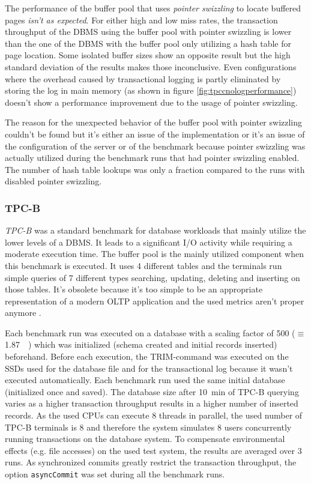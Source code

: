     The performance of the buffer pool that uses \emph{pointer swizzling} to locate buffered pages \emph{isn't as expected}. For either high and low miss rates, the transaction throughput of the DBMS using the buffer pool with pointer swizzling is lower than the one of the DBMS with the buffer pool only utilizing a hash table for page location. Some isolated buffer sizes show an opposite result but the high standard deviation of the results makes those inconclusive. Even configurations where the overhead caused by transactional logging is partly eliminated by storing the log in main memory (as shown in figure \ref{fig:tpccnologperformance}) doesn't show a performance improvement due to the usage of pointer swizzling.

    The reason for the unexpected behavior of the buffer pool with pointer swizzling couldn't be found but it's either an issue of the implementation or it's an issue of the configuration of the server or of the benchmark because pointer swizzling was actually utilized during the benchmark runs that had pointer swizzling enabled. The number of hash table lookups was only a fraction compared to the runs with disabled pointer swizzling.

\subsubsection{TPC-B}

    \emph{TPC-B} \cite{TPC-B} was a standard benchmark for database workloads that mainly utilize the lower levels of a DBMS. It leads to a significant I/O activity while requiring a moderate execution time. The buffer pool is the mainly utilized component when this benchmark is executed. It uses 4 different tables and the terminals run simple queries of 7 different types searching, updating, deleting and inserting on those tables. It's obsolete because it's too simple to be an appropriate representation of a modern OLTP application and the used metrics aren't proper anymore \cite{Levine:1993}.

    Each benchmark run was executed on a database with a scaling factor of 500 ($\equiv$ \SI{1.87}{\gibi\byte}) which was initialized (schema created and initial records inserted) beforehand. Before each execution, the TRIM-command was executed on the SSDs used for the database file and for the transactional log because it wasn't executed automatically. Each benchmark run used the same initial database (initialized once and saved). The database size after \SI{10}{\minute} of TPC-B querying varies as a higher transaction throughput results in a higher number of inserted records. As the used CPUs can execute 8 threads in parallel, the used number of TPC-B terminals is 8 and therefore the system simulates 8 users concurrently running transactions on the database system. To compensate environmental effects (e.g. file accesses) on the used test system, the results are averaged over 3 runs. As synchronized commits greatly restrict the transaction throughput, the option \lstinline{asyncCommit} was set during all the benchmark runs.

